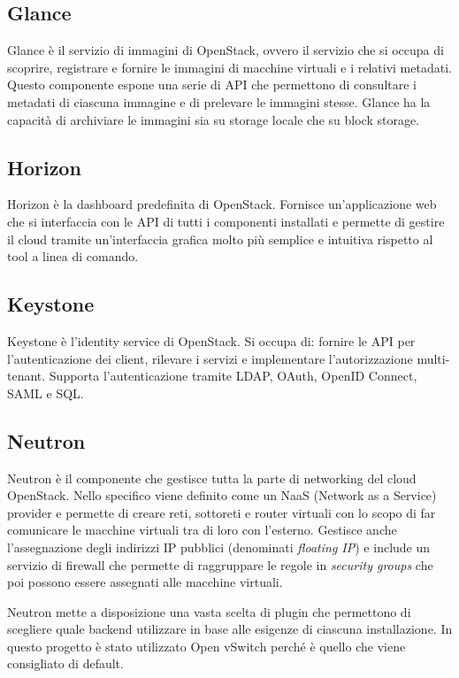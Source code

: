 \subsection{Glance}\label{sec:openstack_glance}
Glance è il servizio di immagini di OpenStack, ovvero il servizio che si occupa di scoprire, registrare e fornire le immagini di macchine virtuali e i relativi metadati. Questo componente espone una serie di API che permettono di consultare i metadati di ciascuna immagine e di prelevare le immagini stesse. Glance ha la capacità di archiviare le immagini sia su storage locale che su block storage.

\subsection{Horizon}\label{sec:openstack_horizon}
Horizon è la dashboard predefinita di OpenStack. Fornisce un'applicazione web che si interfaccia con le API di tutti i componenti installati e permette di gestire il cloud tramite un'interfaccia grafica molto più semplice e intuitiva rispetto al tool a linea di comando.

\subsection{Keystone}\label{sec:openstack_keystone}
Keystone è l'identity service di OpenStack. Si occupa di: fornire le API per l'autenticazione dei client, rilevare i servizi e implementare l'autorizzazione multi-tenant.
Supporta l'autenticazione tramite LDAP, OAuth, OpenID Connect, SAML e SQL.

\subsection{Neutron}\label{sec:openstack_neutron}
Neutron è il componente che gestisce tutta la parte di networking del cloud OpenStack. Nello specifico viene definito come un NaaS (Network as a Service) provider e permette di creare reti, sottoreti e router virtuali con lo scopo di far comunicare le macchine virtuali tra di loro con l'esterno. Gestisce anche l'assegnazione degli indirizzi IP pubblici (denominati \textit{floating IP}) e include un servizio di firewall che permette di raggruppare le regole in \textit{security groups} che poi possono essere assegnati alle macchine virtuali.

Neutron mette a disposizione una vasta scelta di plugin che permettono di scegliere quale backend utilizzare in base alle esigenze di ciascuna installazione. In questo progetto è stato utilizzato Open vSwitch perché è quello che viene consigliato di default.

